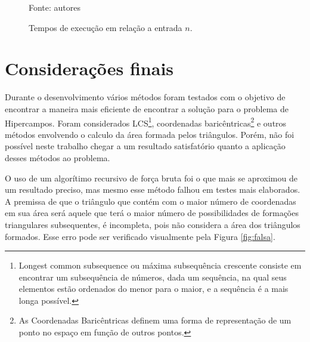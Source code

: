 \documentclass[12pt,a4paper]{article}
\begin{document}
\begin{figure}[!h]
	\caption{Tempos de execução em relação a entrada $n$.}
	\label{fig:orientacao}
	\footnotesize \hphantom{spacessss}Fonte: autores
\end{figure}

\pagebreak

\section{Considerações finais}

Durante o desenvolvimento vários métodos foram testados com o objetivo de encontrar a maneira mais eficiente de encontrar a solução para o problema de Hipercampos. Foram considerados LCS\footnote{Longest common subsequence ou máxima subsequência crescente consiste em encontrar um subsequência de números, dada um sequência, na qual seus elementos estão ordenados  do menor para o maior, e a sequência é a mais longa possível.}, coordenadas baricêntricas\footnote{As Coordenadas Baricêntricas definem uma forma de representação de um ponto no espaço em função de outros pontos.} e outros métodos envolvendo o calculo da área formada pelos triângulos. Porém, não foi possível neste trabalho chegar a um resultado satisfatório quanto a aplicação desses métodos ao problema.

O uso de um algorítimo recursivo de força bruta foi o que mais se aproximou de um resultado preciso, mas mesmo esse método falhou em testes mais elaborados. A premissa de que o triângulo que contém com o maior número de coordenadas em sua área será aquele que terá o maior número de possibilidades de formações triangulares subsequentes, é incompleta, pois não considera a área dos triângulos formados. Esse erro pode ser verificado visualmente pela Figura \ref{fig:falsa}.
\end{document}
